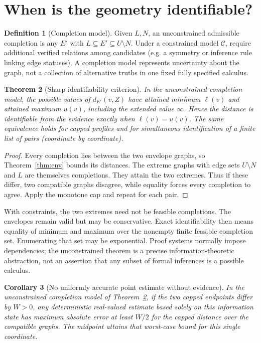 \documentclass[11pt]{article}
\newtheorem{theorem}{Theorem}[section]\newtheorem{proposition}[theorem]{Proposition}\newtheorem{lemma}[theorem]{Lemma}\newtheorem{corollary}[theorem]{Corollary}
\theoremstyle{definition}\newtheorem{definition}[theorem]{Definition}\newtheorem{example}[theorem]{Example}\newtheorem{conjecture}[theorem]{Conjecture}
\begin{document}
\section{When is the geometry identifiable?}
\begin{definition}[Completion model]
Given $L,N$, an unconstrained admissible completion is any $E'$ with $L\subseteq E'\subseteq U\setminus N$. Under a constrained model $\mathcal C$, require additional verified relations among candidates (e.g. a symmetry or inference rule linking edge statuses). A completion model represents uncertainty about the graph, not a collection of alternative truths in one fixed fully specified calculus.
\end{definition}
\begin{theorem}[Sharp identifiability criterion]\label{thm:id}
In the unconstrained completion model, the possible values of $d_{E'}(v,Z)$ have attained minimum $\ell(v)$ and attained maximum $u(v)$, including the extended value $\infty$. Hence the distance is identifiable from the evidence exactly when $\ell(v)=u(v)$. The same equivalence holds for capped profiles and for simultaneous identification of a finite list of pairs (coordinate by coordinate).
\end{theorem}
\begin{proof} Every completion lies between the two envelope graphs, so Theorem~\ref{thm:env} bounds its distances. The extreme graphs with edge sets $U\setminus N$ and $L$ are themselves completions. They attain the two extremes. Thus if these differ, two compatible graphs disagree, while equality forces every completion to agree. Apply the monotone cap and repeat for each pair.\end{proof}
With constraints, the two extremes need not be feasible completions. The envelopes remain valid but may be conservative. Exact identifiability then means equality of minimum and maximum over the nonempty finite feasible completion set. Enumerating that set may be exponential. Proof systems normally impose dependencies; the unconstrained theorem is a precise information-theoretic abstraction, not an assertion that any subset of formal inferences is a possible calculus.
\begin{corollary}[No uniformly accurate point estimate without evidence]
In the unconstrained completion model of Theorem~\ref{thm:id}, if the two capped endpoints differ by $W>0$, any deterministic real-valued estimate based solely on this information state has maximum absolute error at least $W/2$ for the capped distance over the compatible graphs. The midpoint attains that worst-case bound for this single coordinate.
\end{corollary}
\end{document}
